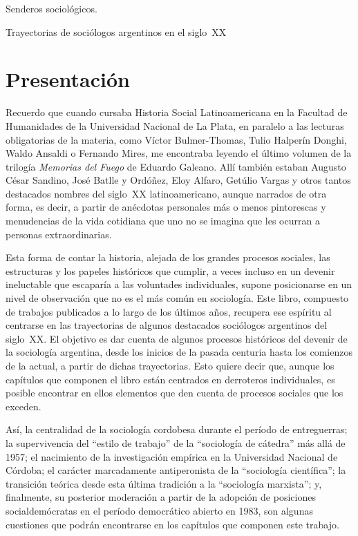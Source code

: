 
\frontmatter



\tableofcontents

Senderos sociológicos.

Trayectorias de sociólogos argentinos en el siglo~XX

\chapter{Presentación}

Recuerdo que cuando cursaba Historia Social Latinoamericana en la Facultad de Humanidades de la Universidad Nacional de La Plata, en paralelo a las lecturas obligatorias de la materia, como Víctor Bulmer-Thomas, Tulio Halperín Donghi, Waldo Ansaldi o Fernando Mires, me encontraba leyendo el último volumen de la trilogía \emph{Memorias del Fuego} de Eduardo Galeano. Allí también estaban Augusto César Sandino, José Batlle y Ordóñez, Eloy Alfaro, Getúlio Vargas y otros tantos destacados nombres del siglo~XX latinoamericano, aunque narrados de otra forma, es decir, a partir de anécdotas personales más o menos pintorescas y menudencias de la vida cotidiana que uno no se imagina que les ocurran a personas extraordinarias.

Esta forma de contar la historia, alejada de los grandes procesos sociales, las estructuras y los papeles históricos que cumplir, a veces incluso en un devenir ineluctable que escaparía a las voluntades individuales, supone posicionarse en un nivel de observación que no es el más común en sociología. Este libro, compuesto de trabajos publicados a lo largo de los últimos años, recupera ese espíritu al centrarse en las trayectorias de algunos destacados sociólogos argentinos del siglo~XX. El objetivo es dar cuenta de algunos procesos históricos del devenir de la sociología argentina, desde los inicios de la pasada centuria hasta los comienzos de la actual, a partir de dichas trayectorias. Esto quiere decir que, aunque los capítulos que componen el libro están centrados en derroteros individuales, es posible encontrar en ellos elementos que den cuenta de procesos sociales que los exceden.

Así, la centralidad de la sociología cordobesa durante el período de entreguerras; la supervivencia del \enquote{estilo de trabajo} de la \enquote{sociología de cátedra} más allá de 1957; el nacimiento de la investigación empírica en la Universidad Nacional de Córdoba; el carácter marcadamente antiperonista de la \enquote{sociología científica}; la transición teórica desde esta última tradición a la \enquote{sociología marxista}; y, finalmente, su posterior moderación a partir de la adopción de posiciones socialdemócratas en el período democrático abierto en 1983, son algunas cuestiones que podrán encontrarse en los capítulos que componen este trabajo.

